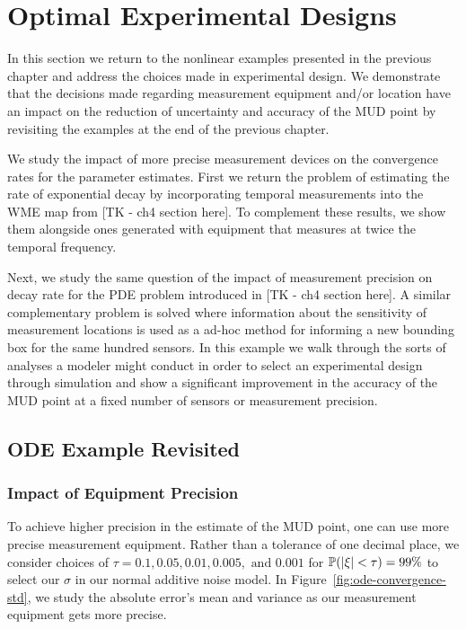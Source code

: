 \section{Optimal Experimental Designs}

In this section we return to the nonlinear examples presented in the previous chapter and address the choices made in experimental design.
We demonstrate that the decisions made regarding measurement equipment and/or location have an impact on the reduction of uncertainty and accuracy of the MUD point by revisiting the examples at the end of the previous chapter.


We study the impact of more precise measurement devices on the convergence rates for the parameter estimates.
First we return the problem of estimating the rate of exponential decay by incorporating temporal measurements into the WME map from [TK - ch4 section here].
To complement these results, we show them alongside ones generated with equipment that measures at twice the temporal frequency.

Next, we study the same question of the impact of measurement precision on decay rate for the PDE problem introduced in [TK - ch4 section here].
A similar complementary problem is solved where information about the sensitivity of measurement locations is used as a ad-hoc method for informing a new bounding box for the same hundred sensors.
In this example we walk through the sorts of analyses a modeler might conduct in order to select an experimental design through simulation and show a significant improvement in the accuracy of the MUD point at a fixed number of sensors or measurement precision.


\subsection{ODE Example Revisited}
\subsubsection{Impact of Equipment Precision}

To achieve higher precision in the estimate of the MUD point, one can use more precise measurement equipment.
Rather than a tolerance of one decimal place, we consider choices of $\tau = 0.1, 0.05, 0.01, 0.005, \text{ and } 0.001$ for $\mathbb{P}( \left\vert\xi\right\vert < \tau ) = 99\%$ to select our $\sigma$ in our normal additive noise model.
In Figure~\ref{fig:ode-convergence-std}, we study the absolute error's mean and variance as our measurement equipment gets more precise.



